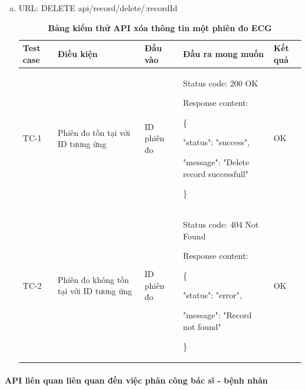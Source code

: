 \begin{enumerate}[a)]
  \item URL: DELETE api/record/delete/{:recordId}
  

  \begin{xltabular}{\textwidth}{
    | >{\raggedright\arraybackslash}p{1cm}
    | >{\raggedright\arraybackslash}p{2.5cm}
    | >{\raggedright\arraybackslash}p{2.5cm}
    | >{\raggedright\arraybackslash}X
    | >{\raggedright\arraybackslash}p{1cm}|
    }
    \caption{\bfseries \fontsize{12pt}{0pt}\selectfont Bảng kiểm thử API xóa thông tin một phiên đo ECG}
    \\
    \hline
    \bfseries Test case    &\bfseries Điều kiện   &\bfseries Đầu vào 
    &\bfseries Đầu ra mong muốn &\bfseries Kết quả\\ \hline
  
  
    TC-1
    & Phiên đo tồn tại với ID tương ứng
    & ID phiên đo 

    & 
  
    Status code: 200 OK
  
      Response content:
  
      \{
  
    "status": "success",

    "message": "Delete record successfull"
  
    \}
    & OK
  
    \\ \hline
  
    TC-2
    & Phiên đo không tồn tại với ID tương ứng
    & ID phiên đo 

   &
  
    Status code: 404 Not Found
  
      Response content:
  
      \{
  
    "status": "error",
  
    "message": "Record not found"
  
    \}
    & OK
  
    \\ \hline

  
    \end{xltabular}


\end{enumerate}


\paragraph{API liên quan liên quan đến việc phân công bác sĩ - bệnh nhân}
\mbox{}

